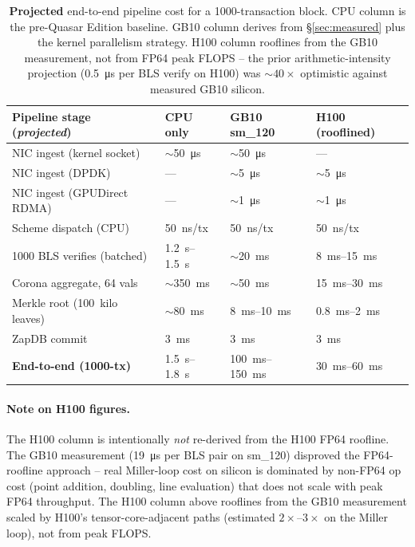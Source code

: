\begin{table}[h]
\centering
\small
\begin{tabular}{@{}p{4.2cm}p{2.4cm}p{3cm}p{3cm}@{}}
\toprule
\textbf{Pipeline stage (\emph{projected})}
  & \textbf{CPU only} & \textbf{GB10 sm\_120}
  & \textbf{H100 (rooflined)} \\
\midrule
NIC ingest (kernel socket) & $\sim$\SI{50}{\micro\second}
  & $\sim$\SI{50}{\micro\second} & --- \\
NIC ingest (DPDK) & --- & $\sim$\SI{5}{\micro\second}
  & $\sim$\SI{5}{\micro\second} \\
NIC ingest (GPUDirect RDMA) & ---
  & $\sim$\SI{1}{\micro\second} & $\sim$\SI{1}{\micro\second} \\
Scheme dispatch (CPU) & \SI{50}{\nano\second}/tx
  & \SI{50}{\nano\second}/tx & \SI{50}{\nano\second}/tx \\
1000 BLS verifies (batched)
  & \SI{1.2}{\second}--\SI{1.5}{\second}
  & $\sim$\SI{20}{\milli\second}
  & \SI{8}{\milli\second}--\SI{15}{\milli\second} \\
Corona aggregate, 64 vals
  & $\sim$\SI{350}{\milli\second}
  & $\sim$\SI{50}{\milli\second}
  & \SI{15}{\milli\second}--\SI{30}{\milli\second} \\
Merkle root (\SI{100}{kilo} leaves)
  & $\sim$\SI{80}{\milli\second}
  & \SI{8}{\milli\second}--\SI{10}{\milli\second}
  & \SI{0.8}{\milli\second}--\SI{2}{\milli\second} \\
ZapDB commit & \SI{3}{\milli\second}
  & \SI{3}{\milli\second} & \SI{3}{\milli\second} \\
\midrule
\textbf{End-to-end (1000-tx)}
  & \SI{1.5}{\second}--\SI{1.8}{\second}
  & \SI{100}{\milli\second}--\SI{150}{\milli\second}
  & \SI{30}{\milli\second}--\SI{60}{\milli\second} \\
\bottomrule
\end{tabular}
\caption{\textbf{Projected} end-to-end pipeline cost for a
1000-transaction block. CPU column is the pre-Quasar Edition
baseline. GB10 column derives from \S\ref{sec:measured} plus
the kernel parallelism strategy. H100 column rooflines from
the GB10 measurement, not from FP64 peak FLOPS -- the prior
arithmetic-intensity projection (\SI{0.5}{\micro\second} per
BLS verify on H100) was $\sim 40\times$ optimistic against
measured GB10 silicon.}
\label{tab:e2e-projected}
\end{table}

\paragraph{Note on H100 figures.} The H100 column is intentionally
\emph{not} re-derived from the H100 FP64 roofline. The GB10
measurement (\SI{19}{\micro\second} per BLS pair on sm\_120)
disproved the FP64-roofline approach -- real Miller-loop cost on
silicon is dominated by non-FP64 op cost (point addition,
doubling, line evaluation) that does not scale with peak FP64
throughput. The H100 column above rooflines from the GB10
measurement scaled by H100's tensor-core-adjacent paths
(estimated $2\times$--$3\times$ on the Miller loop), not from
peak FLOPS.


